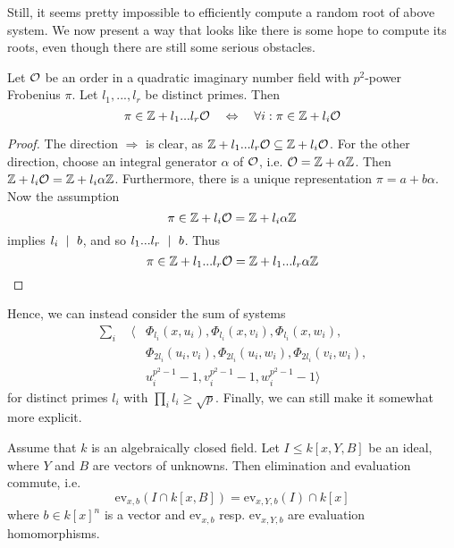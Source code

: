 Still, it seems pretty impossible to efficiently compute a random root of above system.
We now present a way that looks like there is some hope to compute its roots, even though there are still some serious obstacles.
\begin{prop}
    Let $\mathcal{O}$ be an order in a quadratic imaginary number field with $p^2$-power Frobenius $\pi$.
    Let $l_1, ..., l_r$ be distinct primes.
    Then
    \begin{equation*}
        \pi \in \mathbb{Z} + l_1 ... l_r \mathcal{O} \quad \Leftrightarrow \quad \forall i: \pi \in \mathbb{Z} + l_i \mathcal{O}
    \end{equation*}
\end{prop}
\begin{proof}
    The direction $\Rightarrow$ is clear, as $\mathbb{Z} + l_1 ... l_r \mathcal{O} \subseteq \mathbb{Z} + l_i\mathcal{O}$.
    For the other direction, choose an integral generator $\alpha$ of $\mathcal{O}$, i.e. $\mathcal{O} = \mathbb{Z} + \alpha\mathbb{Z}$.
    Then $\mathbb{Z} + l_i\mathcal{O} = \mathbb{Z} + l_i\alpha\mathbb{Z}$.
    Furthermore, there is a unique representation $\pi = a + b\alpha$.
    Now the assumption
    \begin{equation*}
        \pi \in \mathbb{Z} + l_i\mathcal{O} = \mathbb{Z} + l_i\alpha\mathbb{Z}
    \end{equation*}
    implies $l_i \ \mid \  b$, and so $l_1 ... l_r \ \mid \  b$.
    Thus
    \begin{equation*}
        \pi \in \mathbb{Z} + l_1 ... l_r \mathcal{O} = \mathbb{Z} + l_1 ... l_r \alpha \mathbb{Z} \qedhere
    \end{equation*}
\end{proof}
Hence, we can instead consider the sum of systems
\begin{align*}
    \sum_i \quad \langle &\Phi_{l_i}(x, u_i), \Phi_{l_i}(x, v_i), \Phi_{l_i}(x, w_i), \\
    &\Phi_{2l_i}(u_i, v_i), \Phi_{2l_i}(u_i, w_i), \Phi_{2l_i}(v_i, w_i), \\
    &u_i^{p^2 - 1} - 1, v_i^{p^2 - 1} - 1, w_i^{p^2 - 1} - 1 \rangle 
\end{align*}
for distinct primes $l_i$ with $\prod_i l_i \geq \sqrt{p}$.
Finally, we can still make it somewhat more explicit.
\begin{lemma}
    Assume that $k$ is an algebraically closed field.
    Let $I \leq k[x, Y, B]$ be an ideal, where $Y$ and $B$ are vectors of unknowns.
    Then elimination and evaluation commute, i.e.
    \begin{equation*}
        \mathrm{ev}_{x, b}(I \cap k[x, B]) = \mathrm{ev}_{x, Y, b}(I) \cap k[x]
    \end{equation*}
    where $b \in k[x]^n$ is a vector and $\mathrm{ev}_{x, b}$ resp. $\mathrm{ev}_{x, Y, b}$ are evaluation homomorphisms.
\end{lemma}
